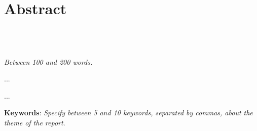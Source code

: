 \chapter{Abstract}
\section*{\textit{\TITULO}\\  {\small{\textit{\SUBTITULO}}}}

\textit{Between 100 and 200 words.}

...

...



\textbf{Keywords}: \textit{Specify between 5 and 10 keywords, separated by commas, about the theme of the report}.
